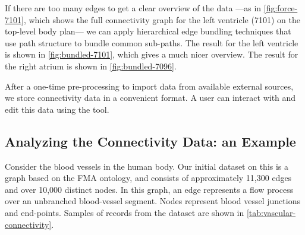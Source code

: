 If there are too many edges to get a clear overview of the data ---as in \cref{fig:force-7101},
which shows the full connectivity graph for the left ventricle (7101) on the top-level body plan---
we can apply hierarchical edge bundling techniques that use path structure to bundle common sub-paths.
The result for the left ventricle is shown in \cref{fig:bundled-7101}, which gives a much nicer
overview. The result for the right atrium is shown in \cref{fig:bundled-7096}.

After a one-time pre-processing to import data from available external sources, we store connectivity data in a convenient format. A user can interact with and edit this data using the tool.


\subsection{Analyzing the Connectivity Data: an Example} %

Consider the blood vessels in the human body. Our initial dataset on this is a graph based on the FMA ontology, and consists of approximately 11,300 edges and over 10,000 distinct nodes. In this graph, an edge represents a flow process over an unbranched blood-vessel segment. Nodes represent blood vessel junctions and end-points. Samples of records from the dataset are shown in \cref{tab:vascular-connectivity}.

